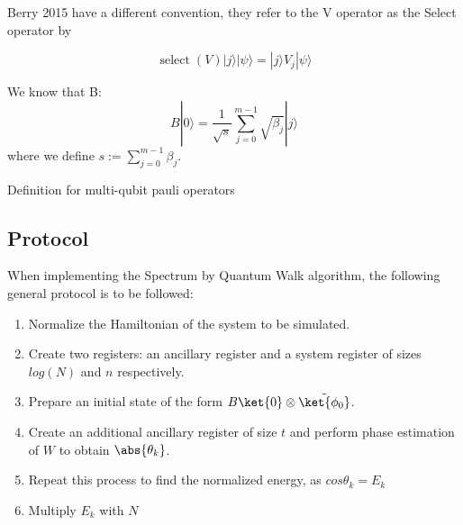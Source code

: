 Berry 2015 have a different convention, they refer to the V operator as the Select operator by

$$
\operatorname{select}(V)|j\rangle|\psi\rangle=|j\rangle V_{j}|\psi\rangle
$$

We know that B:
\[
B|0\rangle=\frac{1}{\sqrt{s}} \sum_{j=0}^{m-1} \sqrt{\beta_{j}}|j\rangle
\]
where we define \(s:=\sum_{j=0}^{m-1} \beta_{j} .\)

Definition for multi-qubit pauli operators



\subsection{Protocol}


When implementing the Spectrum by Quantum Walk algorithm, the following general protocol is to be followed:

\begin{enumerate}
  \item Normalize the Hamiltonian of the system to be simulated.
  \item Create two registers: an ancillary register and a system register of sizes $log(N)$ and $n$ respectively.
  \item Prepare an initial state of the form $ B \ket{0} \otimes \tilde{\ket{\phi_0}}$.
  \item Create an additional ancillary register of size $t$ and perform phase estimation of $W$ to obtain $\abs{\theta_k}$.
  \item Repeat this process to find the normalized energy, as $cos \theta_k = E_k$
  \item Multiply $E_k$ with $N$
\end{enumerate}
